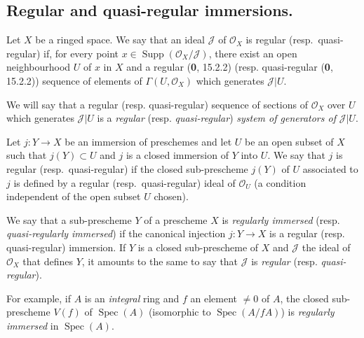 \subsection{Regular and quasi-regular immersions.}

\begin{definition}[16.9.1]\label{IV.16.9.1}
Let $X$ be a ringed space. We say that an ideal $\mathscr{J}$ of
$\mathcal{O}_X$ is regular \textup{(resp.}\ quasi-regular\textup{)} if, for
every point $x\in\operatorname{Supp}(\mathcal{O}_X/\mathscr{J})$, there exist
an open neighbourhood $U$ of $x$ in $X$ and a regular \textup{(\textbf{0}, 15.2.2) (resp.}
quasi-regular \textup{(\textbf{0}, 15.2.2))} sequence of elements of $\Gamma(U,\mathcal{O}_X)$
which generates $\mathscr{J}|U$.
\end{definition}

We will say that a regular (resp. quasi-regular) sequence of sections of
$\mathcal{O}_X$ over $U$ which generates $\mathscr{J}|U$ is a
\emph{regular} (resp. \emph{quasi-regular}) \emph{system of generators
of} $\mathscr{J}|U$.

\begin{definition}[16.9.2]\label{IV.16.9.2}
Let $j:Y\to X$ be an immersion of preschemes and let $U$ be an open subset of
$X$ such that $j(Y)\subset U$ and $j$ is a closed immersion of $Y$ into $U$.
We say that $j$ is regular \textup{(resp.}\ quasi-regular\textup{)} if the
closed sub-prescheme $j(Y)$ of $U$ associated to $j$ is defined by a regular
\textup{(resp.}\ quasi-regular\textup{)} ideal of $\mathcal{O}_U$ \textup{(a condition independent of
the open subset $U$ chosen)}.
\end{definition}

We say that a sub-prescheme $Y$ of a prescheme $X$ is \emph{regularly
immersed} (resp. \emph{quasi-regularly immersed}) if the canonical injection
$j:Y\to X$ is a regular (resp. quasi-regular) immersion. If $Y$ is a
closed sub-prescheme of $X$ and $\mathscr{J}$ the ideal of $\mathcal{O}_X$
that defines $Y$, it amounts to the same to say that $\mathscr{J}$ is
\emph{regular} (resp. \emph{quasi-regular}).

For example, if $A$ is an \emph{integral} ring and $f$ an element $\neq0$ of
$A$, the closed sub-prescheme $V(f)$ of $\operatorname{Spec}(A)$ (isomorphic to
$\operatorname{Spec}(A/fA)$) is \emph{regularly immersed} in
$\operatorname{Spec}(A)$.

